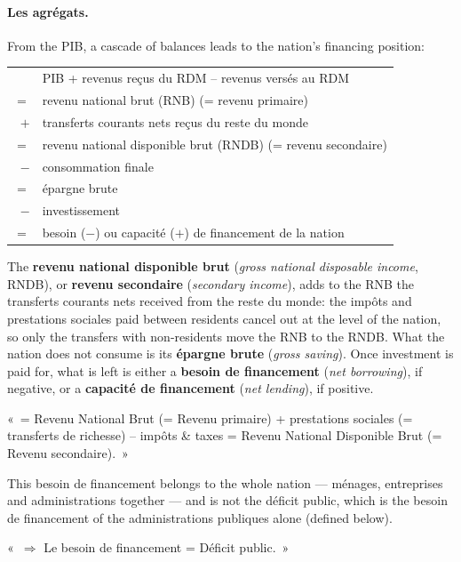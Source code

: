 \paragraph{Les agrégats.} From the PIB, a cascade of balances leads to the
nation's financing position:
\begin{center}
  \begin{tabular}{@{}rl@{}}
    & PIB + revenus reçus du RDM -- revenus versés au RDM \\
    $=$ & revenu national brut (RNB) \quad (= revenu primaire) \\
    $+$ & transferts courants nets reçus du reste du monde \\
    $=$ & revenu national disponible brut (RNDB) \quad (= revenu secondaire) \\
    $-$ & consommation finale \\
    $=$ & épargne brute \\
    $-$ & investissement \\
    $=$ & besoin ($-$) ou capacité ($+$) de financement de la nation
  \end{tabular}
\end{center}

The \textbf{revenu national disponible brut} (\textit{gross national
disposable income}, RNDB), or \textbf{revenu secondaire} (\textit{secondary income}),
adds to the RNB the transferts courants nets received from the reste du monde:
the impôts and prestations sociales paid between residents cancel out at the
level of the nation, so only the transfers with non-residents move the RNB to the RNDB. What
the nation does not consume is its \textbf{épargne brute} (\textit{gross
saving}). Once investment is paid for, what is left is either a \textbf{besoin
de financement} (\textit{net borrowing}), if negative, or a \textbf{capacité de
financement} (\textit{net lending}), if positive.

\begin{remark}
  «~= Revenu National Brut (= Revenu primaire) + prestations sociales
  (= transferts de richesse) -- impôts \& taxes = Revenu National Disponible Brut
  (= Revenu secondaire).~»
\end{remark}

This besoin de financement belongs to the whole nation --- ménages, entreprises
and administrations together --- and is not the déficit public, which is the
besoin de financement of the administrations publiques alone (defined below).

\begin{remark}
  «~$\Rightarrow$ Le besoin de financement = Déficit public.~»
\end{remark}

